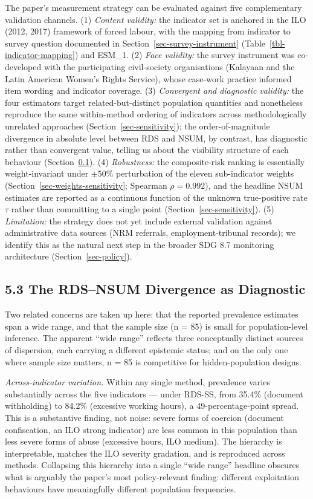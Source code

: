 \documentclass[
  12pt,
  letterpaper,
  DIV=11,
  numbers=noendperiod]{scrartcl}
\begin{document}
The paper's measurement strategy can be evaluated against five
complementary validation channels. (1) \emph{Content validity:} the
indicator set is anchored in the ILO (2012, 2017) framework of forced
labour, with the mapping from indicator to survey question documented in
Section~\ref{sec-survey-instrument} (Table~\ref{tbl-indicator-mapping})
and ESM\_1. (2) \emph{Face validity:} the survey instrument was
co-developed with the participating civil-society organisations
(Kalayaan and the Latin American Women's Rights Service), whose
case-work practice informed item wording and indicator coverage. (3)
\emph{Convergent and diagnostic validity:} the four estimators target
related-but-distinct population quantities and nonetheless reproduce the
same within-method ordering of indicators across methodologically
unrelated approaches (Section~\ref{sec-sensitivity}); the
order-of-magnitude divergence in absolute level between RDS and NSUM, by
contrast, has diagnostic rather than convergent value, telling us about
the visibility structure of each behaviour
(Section~\ref{sec-divergence}). (4) \emph{Robustness:} the
composite-risk ranking is essentially weight-invariant under
\(\pm 50\%\) perturbation of the eleven sub-indicator weights
(Section~\ref{sec-weights-sensitivity}; Spearman \(\rho = 0.992\)), and
the headline NSUM estimates are reported as a continuous function of the
unknown true-positive rate \(\tau\) rather than committing to a single
point (Section~\ref{sec-sensitivity}). (5) \emph{Limitation:} the
strategy does not yet include external validation against administrative
data sources (NRM referrals, employment-tribunal records); we identify
this as the natural next step in the broader SDG 8.7 monitoring
architecture (Section~\ref{sec-policy}).

\subsection{5.3 The RDS--NSUM Divergence as
Diagnostic}\label{sec-divergence}

Two related concerns are taken up here: that the reported prevalence
estimates span a wide range, and that the sample size (n = 85) is small
for population-level inference. The apparent ``wide range'' reflects
three conceptually distinct sources of dispersion, each carrying a
different epistemic status; and on the only one where sample size
matters, n = 85 is competitive for hidden-population designs.

\emph{Across-indicator variation.} Within any single method, prevalence
varies substantially across the five indicators --- under RDS-SS, from
35.4\% (document withholding) to 84.2\% (excessive working hours), a
49-percentage-point spread. This is a substantive finding, not noise:
severe forms of coercion (document confiscation, an ILO strong
indicator) are less common in this population than less severe forms of
abuse (excessive hours, ILO medium). The hierarchy is interpretable,
matches the ILO severity gradation, and is reproduced across methods.
Collapsing this hierarchy into a single ``wide range'' headline obscures
what is arguably the paper's most policy-relevant finding: different
exploitation behaviours have meaningfully different population
frequencies.
\end{document}
